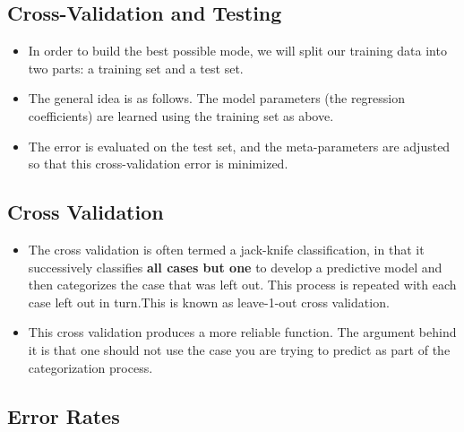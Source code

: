 \documentclass[a4paper,12pt]{article}
\begin{document}
\subsection{Cross-Validation and Testing}
\begin{itemize}
	\item In order to build the best possible mode, we will split our training data into two parts: a training set and a test set. 
	
	\item 	The general idea is as follows. The model parameters (the regression coefficients) are learned using the training set as above. 
	\item The error is evaluated on the test set, and the meta-parameters are adjusted so that this cross-validation error is minimized. 

\end{itemize}	
\subsection{Cross Validation}
\begin{itemize}	
%	
	\item The cross validation is often termed a jack-knife classification, in that
	it successively classifies \textbf{all cases but one} to develop a predictive model and then
	categorizes the case that was left out. This process is repeated with each case left out in
	turn.This is known as leave-1-out cross validation. 
	
	\item 	This cross validation produces a more reliable function. The argument behind it is that
	one should not use the case you are trying to predict as part of the categorization process.
\end{itemize}



\subsection{Error Rates}
\end{document}
